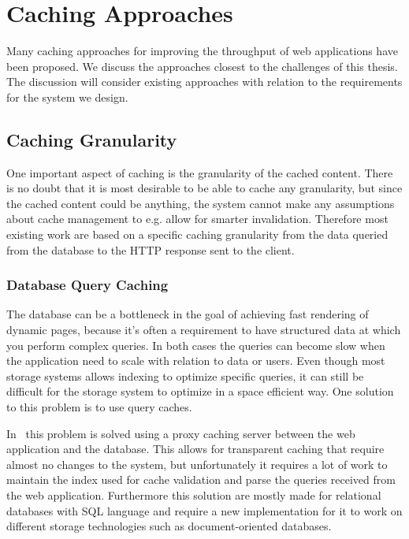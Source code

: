 \chapter{Caching Approaches}
\label{cha:caching_approaches}



Many caching approaches for improving the throughput of web applications have been proposed. We discuss the approaches closest to the challenges of this thesis. The discussion will consider existing approaches with relation to the requirements for the system we design.

\section{Caching Granularity}

One important aspect of caching is the granularity of the cached content. There is no doubt that it is most desirable to be able to cache any granularity, but since the cached content could be anything, the system cannot make any assumptions about cache management to e.g. allow for smarter invalidation. Therefore most existing work are based on a specific caching granularity from the data queried from the database to the HTTP response sent to the client.

\subsection{Database Query Caching}

The database can be a bottleneck in the goal of achieving fast rendering of dynamic pages, because it’s often a requirement to have structured data at which you perform complex queries. In both cases the queries can become slow when the application need to scale with relation to data or users. Even though most storage systems allows indexing to optimize specific queries, it can still be difficult for the storage system to optimize in a space efficient way. One solution to this problem is to use query caches.

In~\cite{paper:transparent-caching, paper:cosar} this problem is solved using a proxy caching server between the web application and the database. This allows for transparent caching that require almost no changes to the system, but unfortunately it requires a lot of work to maintain the index used for cache validation and parse the queries received from the web application. Furthermore this solution are mostly made for relational databases with SQL language and require a new implementation for it to work on different storage technologies such as document-oriented databases.

